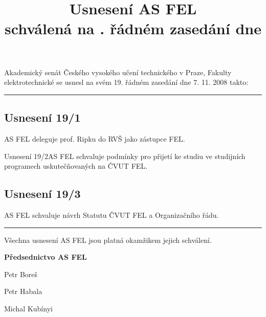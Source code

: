 \documentclass[a4paper,12pt,notitlepage]{article}
\title{Usnesení AS FEL\\schválená na \cislo. řádném zasedání dne \datum}
\author{}\date{}
\newcommand{\cislo}{19}
\newcommand{\datum}{7. 11. 2008 }
\newcommand{\hr}{\bigskip\hrule\bigskip}
\newcommand{\usneseni}[3]{
\subsection*{#1}

#2

}
\begin{document}
\maketitle
\thispagestyle{empty}


Akademický senát Českého vysokého učení technického v Praze, Fakulty
elektrotechnické se usnesl na svém \cislo. řádném zasedání dne \datum takto:\hr

\usneseni{Usnesení \cislo/1}{AS FEL deleguje prof. Ripku do RVŠ jako zástupce FEL.}

\usneseni{Usnesení \cislo/2}{AS FEL schvaluje podmínky pro přijetí ke studiu ve studijních programech                                                 uskutečňovaných na ČVUT FEL.}

\usneseni{Usnesení \cislo/3}{AS FEL schvaluje návrh Statutu ČVUT FEL a Organizačního řádu.}




\bigskip\hr
Všechna usnesení AS FEL jsou platná okamžikem jejich schválení.

\bigskip
\begin{center}
\textbf{Předsednictvo AS FEL}

Petr Boreš

Petr Habala

Michal Kubínyi
\end{center}
\end{document}
